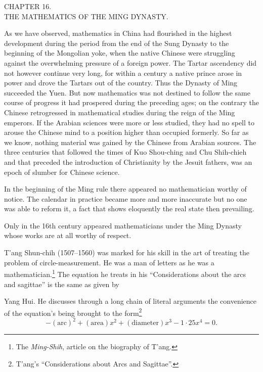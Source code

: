 \documentclass[11pt]{article}
\newcommand{\scanpage}[2]{\clearpage\setcounter{footnote}{0}\noindent{\footnotesize\color{gray}PDF page #1 · #2}\par\medskip}
\newcommand{\scanfooter}{}
\begin{document}
\begin{center}
CHAPTER 16.\\
THE MATHEMATICS OF THE MING DYNASTY.
\end{center}

As we have observed, mathematics in China had flourished in the highest development during the period from the end of the Sung Dynasty to the beginning of the Mongolian yoke, when the native Chinese were struggling against the overwhelming pressure of a foreign power. The Tartar ascendency did not however continue very long, for within a century a native prince arose in power and drove the Tartars out of the country. Thus the Dynasty of Ming succeeded the Yuen. But now mathematics was not destined to follow the same course of progress it had prospered during the preceding ages; on the contrary the Chinese retrogressed in mathematical studies during the reign of the Ming emperors. If the Arabian sciences were more or less studied, they had no spell to arouse the Chinese mind to a position higher than occupied formerly. So far as we know, nothing material was gained by the Chinese from Arabian sources. The three centuries that followed the times of Kuo Shou-ching and Chu Shih-chieh and that preceded the introduction of Christianity by the Jesuit fathers, was an epoch of slumber for Chinese science.

In the beginning of the Ming rule there appeared no mathematician worthy of notice. The calendar in practice became more and more inaccurate but no one was able to reform it, a fact that shows eloquently the real state then prevailing.

Only in the 16th century appeared mathematicians under the Ming Dynasty whose works are at all worthy of respect.

T'ang Shun-chih (1507--1560) was marked for his skill in the art of treating the problem of circle-measurement. He was a man of letters as he was a mathematician.\footnote{The \emph{Ming-Shih}, article on the biography of T'ang.} The equation he treats in his ``Considerations about the arcs and sagittae'' is the same as given by
\scanfooter

\scanpage{0123}{Chapter 16, printed page 109}
\setcounter{footnote}{0}
Yang Hui. He discusses through a long chain of literal arguments the convenience of the equation's being brought to the form\footnote{T'ang's ``Considerations about Arcs and Sagittae''.}
\[
-(\text{arc})^2+(\text{area})x^2+(\text{diameter})x^3-1{\cdot}25x^4=0.
\]
\end{document}
